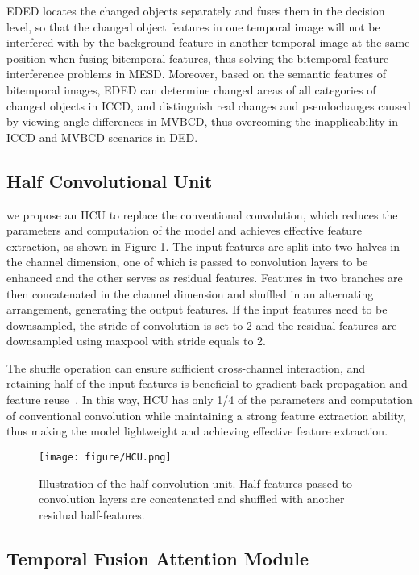\documentclass[journal]{IEEEtran}
\begin{document}
EDED locates the changed objects separately and fuses them in the decision level, so that the changed object features in one temporal image will not be interfered with by the background feature in another temporal image at the same position when fusing bitemporal features, thus solving the bitemporal feature interference problems in MESD. Moreover, based on the semantic features of bitemporal images, EDED can determine changed areas of all categories of changed objects in ICCD, and distinguish real changes and pseudochanges caused by viewing angle differences in MVBCD, thus overcoming the inapplicability in ICCD and MVBCD scenarios in DED.

\subsection{Half Convolutional Unit}
\label{section:3.3}

we propose an HCU to replace the conventional convolution, which reduces the parameters and computation of the model and achieves effective feature extraction, as shown in Figure \ref{Fig:HCU}. The input features are split into two halves in the channel dimension, one of which is passed to convolution layers to be enhanced and the other serves as residual features. Features in two branches are then concatenated in the channel dimension and shuffled in an alternating arrangement, generating the output features. If the input features need to be downsampled, the stride of convolution is set to 2 and the residual features are downsampled using maxpool with stride equals to 2.

The shuffle operation can ensure sufficient cross-channel interaction, and retaining half of the input features is beneficial to gradient back-propagation and feature reuse~\cite{shuffle_v2}. In this way, HCU has only 1/4 of the parameters and computation of conventional convolution while maintaining a strong feature extraction ability, thus making the model lightweight and achieving effective feature extraction.

\begin{figure}[!ht]
 \centering
 \texttt{[image: figure/HCU.png]}
 \caption{Illustration of the half-convolution unit. Half-features passed to convolution layers are concatenated and shuffled with another residual half-features.}
 \label{Fig:HCU}
\end{figure}


\subsection{Temporal Fusion Attention Module}
\label{section:3.4}
\end{document}
